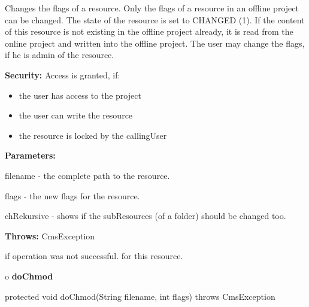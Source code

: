 \begin{description}
\htmlDD Changes the flags of a resource. \htmlBR
Only the flags of a resource in an offline project can be changed. The state
of the resource is set to CHANGED (1). If the content of this resource is not
existing in the offline project already, it is read from the online project
and written into the offline project. The user may change the flags, if he is
admin of the resource. 

{\bf Security:} Access is granted, if: 

\begin{itemize}
\item the user has access to the project 
\item the user can write the resource 
\item the resource is locked by the callingUser 
\end{itemize}

\begin{description}
\item {\bf Parameters:}  

filename - the complete path to the resource.  

flags - the new flags for the resource.  

chRekursive - shows if the subResources (of a folder) should be changed too.  
\item {\bf Throws:} CmsException  

if operation was not successful. for this resource.  
\end{description}

\end{description}

o {\bf doChmod} 

\begin{PRE}
 protected void doChmod(String filename,
                        int flags) throws CmsException
\end{PRE}

